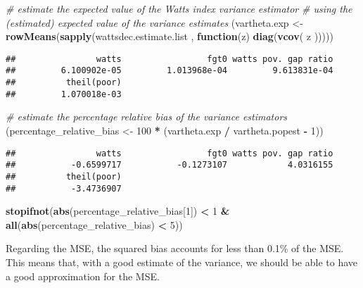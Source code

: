 \documentclass[
]{book}
\newenvironment{Shaded}{\begin{snugshade}}{\end{snugshade}}
\newcommand{\CommentTok}[1]{\textcolor[rgb]{0.56,0.35,0.01}{\textit{#1}}}
\newcommand{\ControlFlowTok}[1]{\textcolor[rgb]{0.13,0.29,0.53}{\textbf{#1}}}
\newcommand{\DecValTok}[1]{\textcolor[rgb]{0.00,0.00,0.81}{#1}}
\newcommand{\FunctionTok}[1]{\textcolor[rgb]{0.13,0.29,0.53}{\textbf{#1}}}
\newcommand{\NormalTok}[1]{#1}
\newcommand{\OtherTok}[1]{\textcolor[rgb]{0.56,0.35,0.01}{#1}}
\newcommand{\SpecialCharTok}[1]{\textcolor[rgb]{0.81,0.36,0.00}{\textbf{#1}}}
\begin{document}
\begin{Shaded}
\begin{Highlighting}[]
\CommentTok{\# estimate the expected value of the Watts index variance estimator}
\CommentTok{\# using the (estimated) expected value of the variance estimates}
\NormalTok{(vartheta.exp }\OtherTok{\textless{}{-}}
    \FunctionTok{rowMeans}\NormalTok{(}\FunctionTok{sapply}\NormalTok{(wattsdec.estimate.list , }\ControlFlowTok{function}\NormalTok{(z)}
      \FunctionTok{diag}\NormalTok{(}\FunctionTok{vcov}\NormalTok{(}
\NormalTok{        z}
\NormalTok{      )))))}
\end{Highlighting}
\end{Shaded}

\begin{verbatim}
##                watts                 fgt0 watts pov. gap ratio 
##         6.100902e-05         1.013968e-04         9.613831e-04 
##          theil(poor) 
##         1.070018e-03
\end{verbatim}

\begin{Shaded}
\begin{Highlighting}[]
\CommentTok{\# estimate the percentage relative bias of the variance estimators}
\NormalTok{(percentage\_relative\_bias }\OtherTok{\textless{}{-}}
    \DecValTok{100} \SpecialCharTok{*}\NormalTok{  (vartheta.exp }\SpecialCharTok{/}\NormalTok{ vartheta.popest }\SpecialCharTok{{-}} \DecValTok{1}\NormalTok{))}
\end{Highlighting}
\end{Shaded}

\begin{verbatim}
##                watts                 fgt0 watts pov. gap ratio 
##           -0.6599717           -0.1273107            4.0316155 
##          theil(poor) 
##           -3.4736907
\end{verbatim}

\begin{Shaded}
\begin{Highlighting}[]
\FunctionTok{stopifnot}\NormalTok{(}\FunctionTok{abs}\NormalTok{(percentage\_relative\_bias[}\DecValTok{1}\NormalTok{]) }\SpecialCharTok{\textless{}} \DecValTok{1} \SpecialCharTok{\&} \FunctionTok{all}\NormalTok{(}\FunctionTok{abs}\NormalTok{(percentage\_relative\_bias) }\SpecialCharTok{\textless{}} \DecValTok{5}\NormalTok{))}
\end{Highlighting}
\end{Shaded}

Regarding the MSE, the squared bias accounts for less than 0.1\% of the MSE.
This means that, with a good estimate of the variance, we should be able to have a good approximation for the MSE.
\end{document}
